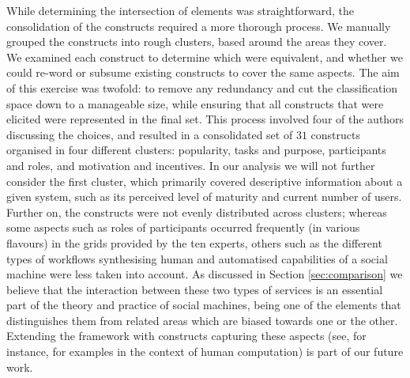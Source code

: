\documentclass{sig-alternate}
\begin{document}

While determining the intersection of elements was straightforward, the consolidation of the
constructs required a more thorough process. We manually grouped the constructs into rough clusters, based around the areas they cover. We examined each construct to determine which were equivalent, and whether we could re-word or subsume existing constructs to cover the same aspects. The aim of this exercise was twofold: to remove any redundancy and cut the classification space down to a manageable size, while ensuring that all constructs that were elicited were represented in the final set. This process involved four of the authors discussing the choices, and resulted in a consolidated set of $31$ constructs organised in four different clusters: popularity, tasks and purpose, participants and roles, and motivation and incentives. In our analysis we will not further consider the first cluster, which primarily covered descriptive information about a given system, such as its perceived level of maturity and current number of users. Further on, the constructs were not evenly distributed across clusters; whereas some aspects such as roles of participants occurred frequently (in various flavours) in the grids provided by the ten experts, others such as the different types of workflows synthesising human and automatised capabilities of a social machine were less taken into account. As discussed in Section \ref{sec:comparison} we believe that the interaction between these two types of services is an essential part of the theory and practice of social machines, being one of the elements that distinguishes them from related areas which are biased towards one or the other. Extending the framework with constructs capturing these aspects (see, for instance, \cite{quinn2011human} for examples in the context of human computation) is part of our future work.
\end{document}
